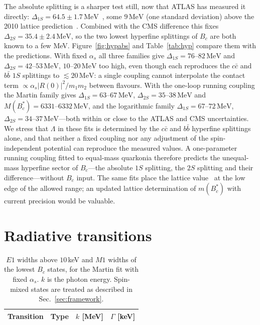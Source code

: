\documentclass[10pt,twocolumn]{article}
\newcommand{\Bc}{B_c}
\newcommand{\Bcs}{B_c^*}
\newcommand{\cc}{c\bar c}
\newcommand{\bb}{b\bar b}
\newcommand{\MeV}{\,\mathrm{MeV}}
\begin{document}
The absolute splitting is a sharper test still, now that ATLAS has measured it directly: $\Delta_{1S}=64.5\pm1.7\MeV$~\cite{ATLAS2026}, some $9\MeV$ (one standard deviation) above the 2010 lattice prediction~\cite{HPQCD2010}.
Combined with the CMS difference this fixes $\Delta_{2S}=35.4\pm2.4\MeV$, so the two lowest hyperfine splittings of $\Bc$ are both known to a few MeV.
Figure~\ref{fig:hypabs} and Table~\ref{tab:hyp} compare them with the predictions.
With fixed $\alpha_s$ all three families give $\Delta_{1S}=76$--$82\MeV$ and $\Delta_{2S}=42$--$53\MeV$, $10$--$20\MeV$ too high, even though each reproduces the $\cc$ and $\bb$ $1S$ splittings to $\lesssim20\MeV$: a single coupling cannot interpolate the contact term $\propto\alpha_s|R(0)|^2/m_1m_2$ between flavours.
With the one-loop running coupling the Martin family gives $\Delta_{1S}=63$--$67\MeV$, $\Delta_{2S}=35$--$38\MeV$ and $M(\Bcs)=6331$--$6332\MeV$, and the logarithmic family $\Delta_{1S}=67$--$72\MeV$, $\Delta_{2S}=34$--$37\MeV$---both within or close to the ATLAS and CMS uncertainties.
We stress that $\Lambda$ in these fits is determined by the $\cc$ and $\bb$ hyperfine splittings alone, and that neither a fixed coupling nor any adjustment of the spin-independent potential can reproduce the measured values.
A one-parameter running coupling fitted to equal-mass quarkonia therefore predicts the unequal-mass hyperfine sector of $\Bc$---the absolute $1S$ splitting, the $2S$ splitting and their difference---without $\Bc$ input.
The same fits place the lattice value~\cite{HPQCD2010} at the low edge of the allowed range; an updated lattice determination of $m(\Bcs)$ with current precision would be valuable.

\section{Radiative transitions}
\label{sec:radiative}

\begin{table}[t]
\caption{$E1$ widths above $10\,$keV and $M1$ widths of the lowest $\Bc$ states, for the Martin fit with fixed $\alpha_s$. $k$ is the photon energy. Spin-mixed states are treated as described in Sec.~\ref{sec:framework}.}
\label{tab:rad}
\centering\small
\begin{tabular}{lccc}
\toprule
Transition & Type & $k$ [MeV] & $\Gamma$ [keV] \\
\midrule

\end{tabular}
\end{table}
\end{document}
